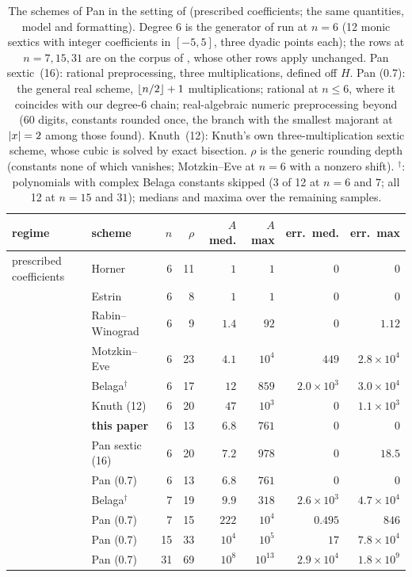 \begin{table}[htbp]
\centering\footnotesize
\begin{tabular}{@{}llrrrrrr@{}}
\toprule
regime & scheme & $n$ & $\rho$ & $A$ med. & $A$ max & err.\ med. & err.\ max \\
\midrule
prescribed coefficients & Horner & 6 & 11 & $1$ & $1$ & $0$ & $0$ \\
 & Estrin & 6 & 8 & $1$ & $1$ & $0$ & $0$ \\
 & Rabin--Winograd & 6 & 9 & $1.4$ & $92$ & $0$ & $1.12$ \\
 & Motzkin--Eve & 6 & 23 & $4.1$ & $10^{4}$ & $449$ & $2.8\times10^{4}$ \\
 & Belaga$^{\dagger}$ & 6 & 17 & $12$ & $859$ & $2.0\times10^{3}$ & $3.0\times10^{4}$ \\
 & Knuth (12) & 6 & 20 & $47$ & $10^{3}$ & $0$ & $1.1\times10^{3}$ \\
 & \textbf{this paper} & 6 & 13 & $6.8$ & $761$ & $0$ & $0$ \\
 & Pan sextic (16) & 6 & 20 & $7.2$ & $978$ & $0$ & $18.5$ \\
 & Pan (0.7) & 6 & 13 & $6.8$ & $761$ & $0$ & $0$ \\
\addlinespace[2pt]
 & Belaga$^{\dagger}$ & 7 & 19 & $9.9$ & $318$ & $2.6\times10^{3}$ & $4.7\times10^{4}$ \\
 & Pan (0.7) & 7 & 15 & $222$ & $10^{4}$ & $0.495$ & $846$ \\
\addlinespace[2pt]
 & Pan (0.7) & 15 & 33 & $10^{4}$ & $10^{5}$ & $17$ & $7.8\times10^{4}$ \\
\addlinespace[2pt]
 & Pan (0.7) & 31 & 69 & $10^{8}$ & $10^{13}$ & $2.9\times10^{4}$ & $1.8\times10^{9}$ \\
\bottomrule
\end{tabular}
\caption{The schemes of Pan in the setting of 
(prescribed coefficients; the same quantities, model and formatting).  Degree
$6$ is the generator of  run at $n=6$ (12 monic sextics
with integer coefficients in $[-5,5]$, three dyadic points each); the rows at
$n=7,15,31$ are on the corpus of , whose other rows apply
unchanged.  Pan sextic~(16): rational preprocessing, three multiplications,
defined off $H$.  Pan (0.7): the general real scheme, $\left\lfloor {n/2} \right\rfloor+1$
multiplications; rational at $n\le6$, where it coincides with our degree-6
chain; real-algebraic numeric preprocessing beyond (60 digits, constants
rounded once, the branch with the smallest majorant at $\left\lvert x\right\rvert=2$ among those
found).  Knuth~(12): Knuth's own three-multiplication sextic scheme, whose
cubic is solved by exact bisection.  $\rho$ is the generic rounding depth
(constants none of which vanishes; Motzkin--Eve at $n=6$ with a nonzero
shift).  $^{\dagger}$: polynomials with complex Belaga constants skipped
(3 of 12 at $n=6$ and $7$; all 12 at $n=15$ and $31$); medians and maxima over
the remaining samples.}
\label{tab:numstab-pan}
\end{table}

